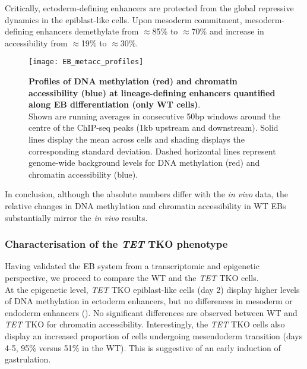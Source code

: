 Critically, ectoderm-defining enhancers are protected from the global repressive dynamics in the epiblast-like cells. Upon mesoderm commitment, mesoderm-defining enhancers demethylate from $\approx$85\% to $\approx$70\% and increase in accessibility from $\approx$19\% to $\approx$30\%.

\begin{figure}[H]
	\centering
	\texttt{[image: EB\_metacc\_profiles]}
	\caption[]{
	\textbf{Profiles of DNA methylation (red) and chromatin accessibility (blue) at lineage-defining enhancers quantified along EB differentiation (only WT cells)}.\\
	Shown are running averages in consecutive 50bp windows around the centre of the ChIP-seq peaks (1kb upstream and downstream). Solid lines display the mean across cells and shading displays the corresponding standard deviation. Dashed horizontal lines represent genome-wide background levels for DNA methylation (red) and chromatin accessibility (blue).
	}
	\label{fig:EB_metacc_profiles}
\end{figure}

In conclusion, although the absolute numbers differ with the \textit{in vivo} data, the relative changes in DNA methylation and chromatin accessibility in WT EBs substantially mirror the \textit{in vivo} results.

\subsubsection{Characterisation of the \textit{TET} TKO phenotype}

Having validated the EB system from a transcriptomic and epigenetic perspective, we proceed to compare the WT and the \textit{TET} TKO cells.\\
At the epigenetic level, \textit{TET} TKO epiblast-like cells (day 2) display higher levels of DNA methylation in ectoderm enhancers, but no differences in mesoderm or endoderm enhancers (). No significant differences are observed between WT and \textit{TET} TKO for chromatin accessibility. Interestingly, the \textit{TET} TKO cells also display an increased proportion of cells undergoing mesendoderm transition (days 4-5, 95\% versus 51\% in the WT). This is suggestive of an early induction of gastrulation.

